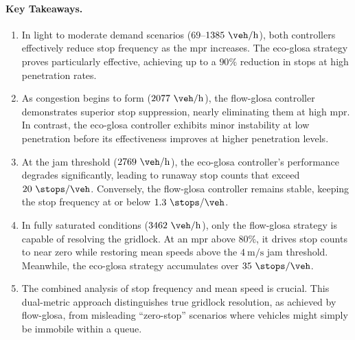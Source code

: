 \paragraph{Key Takeaways.}
\begin{enumerate}[label=(\alph*)]
    \item In light to moderate demand scenarios ($69$--$1385~\unit{\veh\per\hour}$), both controllers effectively reduce stop frequency as the \ac{mpr} increases. The \ac{eco-glosa} strategy proves particularly effective, achieving up to a $90\%$ reduction in stops at high penetration rates.
    
    \item As congestion begins to form ($2077~\unit{\veh\per\hour}$), the \ac{flow-glosa} controller demonstrates superior stop suppression, nearly eliminating them at high \ac{mpr}. In contrast, the \ac{eco-glosa} controller exhibits minor instability at low penetration before its effectiveness improves at higher penetration levels.
    
    \item At the jam threshold ($2769~\unit{\veh\per\hour}$), the \ac{eco-glosa} controller's performance degrades significantly, leading to runaway stop counts that exceed $20~\unit{\stops\per\veh}$. Conversely, the \ac{flow-glosa} controller remains stable, keeping the stop frequency at or below $1.3~\unit{\stops\per\veh}$.
    
    \item In fully saturated conditions ($3462~\unit{\veh\per\hour}$), only the \ac{flow-glosa} strategy is capable of resolving the gridlock. At an \ac{mpr} above $80\%$, it drives stop counts to near zero while restoring mean speeds above the $4~\unit{\metre\per\second}$ jam threshold. Meanwhile, the \ac{eco-glosa} strategy accumulates over $35~\unit{\stops\per\veh}$.
    
    \item The combined analysis of stop frequency and mean speed is crucial. This dual-metric approach distinguishes true gridlock resolution, as achieved by \ac{flow-glosa}, from misleading \enquote{zero-stop} scenarios where vehicles might simply be immobile within a queue.
\end{enumerate}

